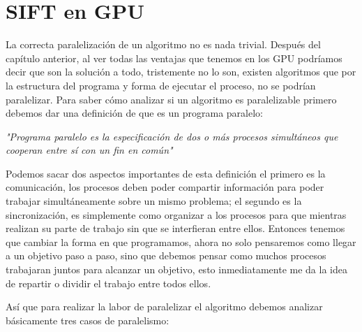 \chapter{ SIFT en GPU}

La correcta paralelización de un algoritmo no es nada trivial. Después del capítulo anterior, al ver todas las ventajas que tenemos en los GPU podríamos decir que son la solución a todo, tristemente no lo son, existen algoritmos que por la estructura del programa y forma de ejecutar el proceso, no se podrían paralelizar. Para saber cómo analizar si un algoritmo es paralelizable primero debemos dar una definición de que es un programa paralelo:

\begin{center}
\textit{"Programa paralelo es la especificación de dos o más procesos simultáneos que cooperan entre sí con un fin en común"}
\end{center}

Podemos sacar dos aspectos importantes de esta definición el primero es la comunicación, los procesos deben poder compartir información  para poder trabajar simultáneamente sobre un mismo problema; el segundo es la sincronización, es simplemente como organizar a los procesos para que mientras realizan su parte de trabajo sin que se interfieran entre ellos.
Entonces tenemos que cambiar la forma en que programamos, ahora no solo pensaremos como llegar a un objetivo paso a paso, sino  que debemos pensar como muchos procesos trabajaran juntos para alcanzar un objetivo, esto inmediatamente me da la idea de repartir o dividir el trabajo entre todos ellos. 

\pagebreak

Así que para realizar la labor de paralelizar el algoritmo debemos analizar básicamente tres casos de paralelismo:
 
